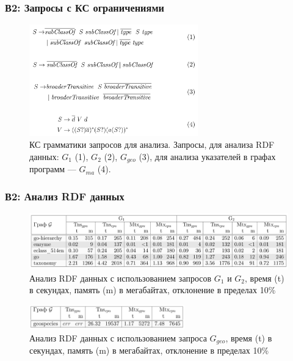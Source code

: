 \documentclass[aspectratio=169,xcolor=table,english]{beamer}
\begin{document}
\begin{frame}[fragile] \frametitle{В2: Запросы с КС ограничениями}
    \begin{center}
     \begin{minipage}[m]{0.85\linewidth}
        \begin{figure}
            \centering
            \includegraphics[width=0.65\textwidth]{figures/cfpq_query_rq2.png}
            \caption{КС грамматики запросов для анализа. Запросы, для анализа RDF данных: $G_1$ (1), $G_2$ (2), $G_{geo}$ (3), для анализа указателей в графах программ --- $G_{ma}$ (4).}
        \end{figure}
    \end{minipage}\hfill   
    \end{center}
\end{frame}

\begin{frame}[fragile] \frametitle{В2: Анализ RDF данных}
    \begin{center}
     \begin{minipage}[m]{0.9\linewidth}
        \begin{figure}
            \centering
            \includegraphics[width=1.0\textwidth]{figures/results_1_rq2.png}
            \caption{Анализ RDF данных с использованием запросов $G_1$ и $G_2$, время (t) в секундах, память (m) в мегабайтах, отклонение в пределах 10\%}
        \end{figure}
    \end{minipage}\hfill   
    \begin{minipage}[m]{0.9\linewidth}
        \begin{figure}
            \centering
            \includegraphics[width=0.6\textwidth]{figures/results_2_rq2.png}
            \caption{Анализ RDF данных с использованием запроса $G_{geo}$, время (t) в секундах, память (m) в мегабайтах, отклонение в пределах 10\%}
        \end{figure}
    \end{minipage}
    \end{center}
\end{frame}
\end{document}
